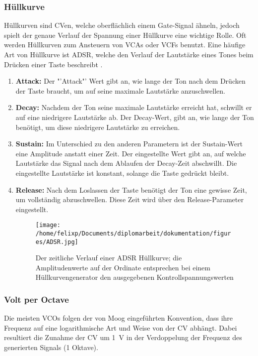 \subsubsection{Hüllkurve}
\label{sec:orgb08c536}
Hüllkurven sind \acl{CV}en, welche oberflächlich einem Gate-Signal ähneln, jedoch spielt der genaue Verlauf der Spannung einer Hüllkurve eine wichtige Rolle. Oft werden Hüllkurven zum Ansteuern von \acp{VCA} oder \acp{VCF} benutzt. Eine häufige Art von Hüllkurve ist \ac{ADSR}, welche den Verlauf der Lautstärke eines Tones beim Drücken einer Taste beschreibt \cite{envelopes}.

\begin{enumerate}
\item \textbf{Attack:}
\label{sec:org79dc270}
Der "'Attack"' Wert gibt an, wie lange der Ton nach dem Drücken der Taste braucht, um auf seine maximale Lautstärke anzuschwellen.

\item \textbf{Decay:}
\label{sec:orgeeb14e5}
Nachdem der Ton seine maximale Lautstärke erreicht hat, schwillt er auf eine niedrigere Lautstärke ab. Der Decay-Wert, gibt an, wie lange der Ton benötigt, um diese niedrigere Lautstärke zu erreichen.

\item \textbf{Sustain:}
\label{sec:orgb7671ae}
Im Unterschied zu den anderen Parametern ist der Sustain-Wert eine Amplitude anstatt einer Zeit. Der eingestellte Wert gibt an, auf welche Lautstärke das Signal nach dem Ablaufen der Decay-Zeit abschwillt. Die eingestellte Lautstärke ist konstant, solange die Taste gedrückt bleibt.

\item \textbf{Release:}
\label{sec:org7cb143a}
Nach dem Loslassen der Taste benötigt der Ton eine gewisse Zeit, um vollständig abzuschwellen.  Diese Zeit wird über den Release-Parameter eingestellt.

\begin{figure}[htbp]
\centering
\texttt{[image: /home/felixp/Documents/diplomarbeit/dokumentation/figures/ADSR.jpg]}
\caption{Der zeitliche Verlauf einer ADSR Hüllkurve; die Amplitudenwerte auf der Ordinate entsprechen bei einem Hüllkurvengenerator den ausgegebenen Kontrollspannungswerten  \cite{envelopes}}
\end{figure}
\end{enumerate}

\subsubsection{Volt per Octave}
\label{sec:org61132ac}
Die meisten \acsp{VCO} folgen der von Moog eingeführten Konvention, dass ihre Frequenz auf eine logarithmische Art und Weise von der \acl{CV} abhängt. Dabei resultiert die Zunahme der \acl{CV} um \SI{1}{\volt} in der Verdoppelung der Frequenz des generierten Signals (1 Oktave).

